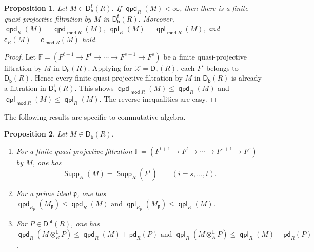 \documentclass[10pt, a4paper,reqno]{amsart}
\newtheorem{prop}[prop]{Proposition}
\theoremstyle{definition}
\theoremstyle{remark}
\numberwithin{equation}{thm}
\def\FF{\mathbb{F}}
\def\cX{\mathcal{X}}
\def\fp{\mathfrak{p}}
\def\c{\mathsf{c}}
\def\mod{\operatorname{\mathsf{mod}}}
\def\Supp{\operatorname{\mathsf{Supp}}}
\def\Db{\mathsf{D_b}}
\def\Dfb{\mathsf{D^f_b}}
\def\Pf{\mathsf{D^{pf}}}
\def\ltensor{\otimes^{\mathbb{L}}}
\def\pd{\mathsf{pd}}
\def\qpd{\operatorname{\mathsf{qpd}}}
\def\qpl{\operatorname{\mathsf{qpl}}}
\begin{document}
\begin{prop}
Let $M \in \Dfb(R)$.
If $\qpd_R(M) < \infty$, then there is a finite quasi-projective filtration by $M$ in $\Dfb(R)$.
Moreover, $\qpd_R(M) = \qpd_{\mod R}(M)$, $\qpl_R(M) = \qpl_{\mod R}(M)$, and $\c_R(M) = \c_{\mod R}(M)$ hold.  
\end{prop}

\begin{proof}
Let $\FF = (F^{t+1} \to F^{t} \to \cdots \to F^{s+1} \to F^s)$ be a finite quasi-projective filtration by $M$ in $\Db(R)$.
Applying  for $\cX = \Dfb(R)$, each $F^i$ belongs to $\Dfb(R)$.
Hence every finite quasi-projective filtration by $M$ in $\Db(R)$ is already a filtration in $\Dfb(R)$.
This shows $\qpd_{\mod R}(M) \le \qpd_R(M)$ and $\qpl_{\mod R}(M) \le \qpl_R(M)$.
The reverse inequalities are easy.
\end{proof}

The following results are specific to commutative algebra.

\begin{prop}\label{proploc}
Let $M \in \Db(R)$.
\begin{enumerate}[\rm(1)]
\item	
For a finite quasi-projective filtration $\FF = (F^{t+1} \to F^{t} \to \cdots \to F^{s+1} \to F^s)$ by $M$, one has 
\[
\Supp_R(M) = \Supp_R(F^i) \qquad (i = s,\ldots,t).
\]

\item
For a prime ideal $\fp$, one has $\qpd_{R_\fp}(M_\fp) \le \qpd_{R}(M) \mbox{ and } \qpl_{R_\fp}(M_\fp) \le \qpl_{R}(M)$.

\item
For $P \in \Pf(R)$, one has $\qpd_{R}(M \ltensor_R P) \le \qpd_R(M) + \pd_R(P) \mbox{ and } \qpl_{R}(M \ltensor_R P) \le \qpl_R(M) + \pd_R(P)$.
\end{enumerate}
\end{prop}
\end{document}
